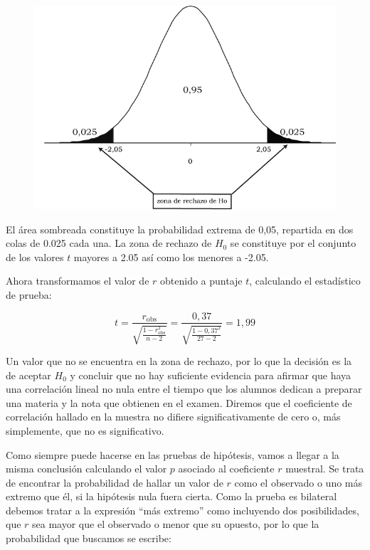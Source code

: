 \documentclass[]{book}
\begin{document}
\begin{figure}

{\centering \includegraphics[width=9in]{imagenes/image209} 

}

\end{figure}

El área sombreada constituye la probabilidad extrema de 0,05, repartida
en dos colas de 0.025 cada una. La zona de rechazo de \(H_0\) se constituye
por el conjunto de los valores \(t\) mayores a 2.05 así como los menores a -2.05.

Ahora transformamos el valor de \(r\) obtenido a puntaje \(t\), calculando
el estadístico de prueba:

\[t = \frac{r_{\text{obs}}}{\sqrt{\frac{1 - r_{\text{obs}}^{2}}{n - 2}}} = \frac{0,37}{\sqrt{\frac{1 - {0,37}^{2}}{27 - 2}}} = 1,99\]

Un valor que no se encuentra en la zona de rechazo, por lo que la
decisión es la de aceptar \(H_0\) y concluir que no hay suficiente
evidencia para afirmar que haya una correlación lineal no nula entre el
tiempo que los alumnos dedican a preparar una materia y la nota que
obtienen en el examen. Diremos que el coeficiente de correlación hallado
en la muestra no difiere significativamente de cero o, más simplemente,
que no es significativo.

Como siempre puede hacerse en las pruebas de hipótesis, vamos a llegar a
la misma conclusión calculando el valor \(p\) asociado al coeficiente \(r\)
muestral. Se trata de encontrar la probabilidad de hallar un valor de
\(r\) como el observado o uno más extremo que él, si la hipótesis nula
fuera cierta. Como la prueba es bilateral debemos tratar a la expresión
``más extremo'' como incluyendo dos posibilidades, que \(r\) sea mayor que
el observado o menor que su opuesto, por lo que la probabilidad que
buscamos se escribe:
\end{document}
